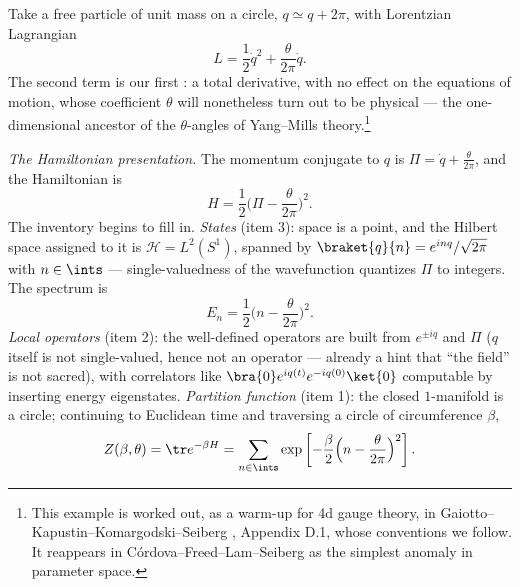 \begin{eexample}[The inventory in $d=1$: a particle on a circle]
\label{ex:particle-circle}
Take a free particle of unit mass on a circle, $q \simeq q + 2\pi$, with
Lorentzian Lagrangian
\begin{equation}
L = \frac{1}{2}\dot q^2 + \frac{\theta}{2\pi} \dot q .
\label{eq:circle-lagrangian}
\end{equation}
The second term is our first : a total derivative, with
no effect on the equations of motion, whose coefficient $\theta$ will
nonetheless turn out to be physical --- the one-dimensional ancestor of the
$\theta$-angles of Yang--Mills theory.\footnote{This example is worked out, as a
warm-up for 4d gauge theory, in Gaiotto--Kapustin--Komargodski--Seiberg
, Appendix D.1, whose conventions we follow. It reappears in
C\'ordova--Freed--Lam--Seiberg  as the simplest anomaly in
parameter space.}

\emph{The Hamiltonian presentation.} The momentum conjugate to $q$ is $\Pi =
\dot q + \frac{\theta}{2\pi}$, and the Hamiltonian is
\begin{equation}
H = \frac{1}{2}\Big(\Pi - \frac{\theta}{2\pi}\Big)^2 .
\end{equation}
The inventory begins to fill in. \emph{States} (item 3): space is a point, and
the Hilbert space assigned to it is $\mathcal{H} = L^2(S^1)$, spanned by
$\braket{q}{n} = e^{inq}/\sqrt{2\pi}$ with $n \in \ints$ --- single-valuedness
of the wavefunction quantizes $\Pi$ to integers. The spectrum is
\begin{equation}
E_n = \frac{1}{2}\Big(n - \frac{\theta}{2\pi}\Big)^2 .
\label{eq:circle-spectrum}
\end{equation}
\emph{Local operators} (item 2): the well-defined operators are built from
$e^{\pm iq}$ and $\Pi$ ($q$ itself is not single-valued, hence not an operator
--- already a hint that ``the field'' is not sacred), with correlators like
$\bra{0} e^{iq(t)} e^{-iq(0)} \ket{0}$ computable by inserting energy
eigenstates. \emph{Partition function} (item 1): the closed $1$-manifold is a
circle; continuing to Euclidean time and traversing a circle of circumference
$\beta$,
\begin{equation}
Z(\beta, \theta) = \tr e^{-\beta H}
  = \sum_{n \in \ints}
    \exp\left[-\frac{\beta}{2}\Big(n - \frac{\theta}{2\pi}\Big)^2\right].
\label{eq:Z-hamiltonian}
\end{equation}


\end{eexample}
